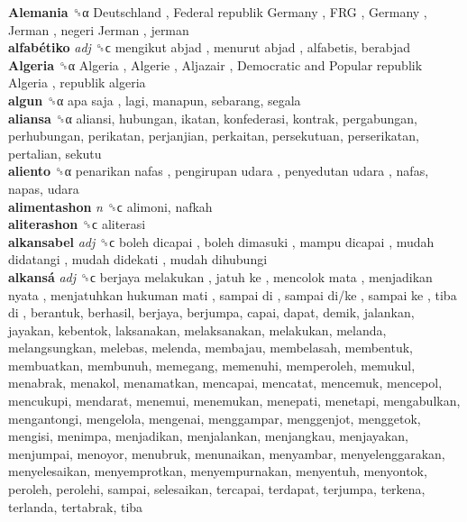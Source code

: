 \textbf{Alemania} ␝α   Deutschland ,  Federal republik Germany ,  FRG ,  Germany ,  Jerman ,  negeri Jerman , jerman  \\
\textbf{alfabétiko} \emph{adj}  ␝ϲ   mengikut abjad ,  menurut abjad , alfabetis, berabjad  \\
\textbf{Algeria} ␝α   Algeria ,  Algerie ,  Aljazair ,  Democratic and Popular republik Algeria ,  republik algeria   \\
\textbf{algun} ␝α   apa saja , lagi, manapun, sebarang, segala  \\
\textbf{aliansa} ␝α  aliansi, hubungan, ikatan, konfederasi, kontrak, pergabungan, perhubungan, perikatan, perjanjian, perkaitan, persekutuan, perserikatan, pertalian, sekutu  \\
\textbf{aliento} ␝α   penarikan nafas ,  pengirupan udara ,  penyedutan udara , nafas, napas, udara  \\
\textbf{alimentashon} \emph{n}  ␝ϲ  alimoni, nafkah  \\
\textbf{aliterashon} ␝ϲ  aliterasi  \\
\textbf{alkansabel} \emph{adj}  ␝ϲ   boleh dicapai ,  boleh dimasuki ,  mampu dicapai ,  mudah didatangi ,  mudah didekati ,  mudah dihubungi   \\
\textbf{alkansá} \emph{adj}  ␝ϲ   berjaya melakukan ,  jatuh ke ,  mencolok mata ,  menjadikan nyata ,  menjatuhkan hukuman mati ,  sampai di ,  sampai di/ke ,  sampai ke ,  tiba di , berantuk, berhasil, berjaya, berjumpa, capai, dapat, demik, jalankan, jayakan, kebentok, laksanakan, melaksanakan, melakukan, melanda, melangsungkan, melebas, melenda, membajau, membelasah, membentuk, membuatkan, membunuh, memegang, memenuhi, memperoleh, memukul, menabrak, menakol, menamatkan, mencapai, mencatat, mencemuk, mencepol, mencukupi, mendarat, menemui, menemukan, menepati, menetapi, mengabulkan, mengantongi, mengelola, mengenai, menggampar, menggenjot, menggetok, mengisi, menimpa, menjadikan, menjalankan, menjangkau, menjayakan, menjumpai, menoyor, menubruk, menunaikan, menyambar, menyelenggarakan, menyelesaikan, menyemprotkan, menyempurnakan, menyentuh, menyontok, peroleh, perolehi, sampai, selesaikan, tercapai, terdapat, terjumpa, terkena, terlanda, tertabrak, tiba  \\
